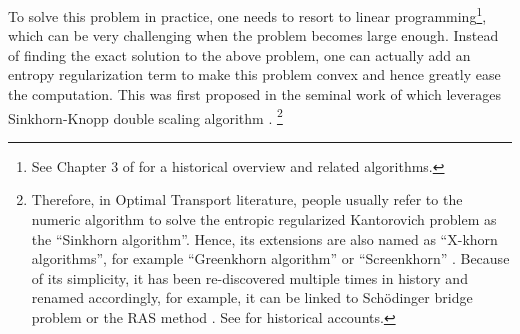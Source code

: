 To solve this problem in practice, one needs to resort to linear programming\footnote{
  See Chapter 3 of \citet{peyre2019} for a historical overview and related algorithms.
}, which can be very challenging when the problem becomes large enough.
Instead of finding the exact solution to the above problem, one can actually add an entropy regularization term
to make this problem convex and hence greatly ease the computation.
This was first proposed in the seminal work of \citet{cuturi2013}
which leverages Sinkhorn-Knopp double scaling algorithm \citep{sinkhorn1964,sinkhorn1967,knight2008}.
\footnote{
  Therefore, in Optimal Transport literature,
  people usually refer to the numeric algorithm to solve the entropic regularized Kantorovich problem
  as the ``Sinkhorn algorithm''.
  Hence, its extensions are also named as ``X-khorn algorithms'',
  for example ``Greenkhorn algorithm'' \citep{altschuler2017} or ``Screenkhorn'' \citep{alaya2019}.
  Because of its simplicity, it has been re-discovered multiple times in history and renamed accordingly,
  for example,
  it can be linked to Sch\"odinger bridge problem \citep{schrodinger1931} or the RAS method \citep{bacharach1970}.
  See \citet{knight2008,leonard2013,modin2024} for historical accounts.
}

